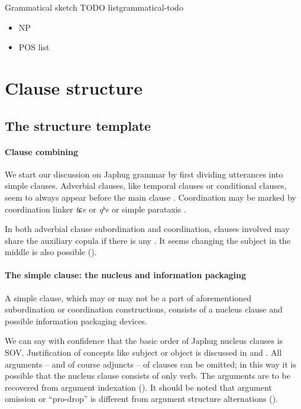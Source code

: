 \documentclass[a4paper, oneside, 12pt]{report}
\newcommand*{\citesec}[1]{\S~{#1}}
\newcommand*{\citechap}[1]{Ch~{#1}}
\newcommand*{\citepage}[1]{p.~{#1}}
\newcommand{\form}[1]{\emph{#1}}
\begin{document}
\begin{todobox}{Grammatical sketch TODO list}{grammatical-todo}
    \begin{itemize}
        \item NP
        \item POS list
    \end{itemize}
\end{todobox}

\section{Clause structure}\label{sec:grammatical.clause}

\subsection{The structure template}\label{sec:grammatical.clause.template}

\paragraph*{Clause combining}
We start our discussion on Japhug grammar 
by first dividing utterances into simple clauses.
Adverbial clauses, like temporal clauses or conditional clauses,
seem to always appear before the main clause \citep[\citechap{25}]{jacques2021grammar}.
Coordination may be marked by coordination linker \form{tɕe} or \form{qʰe} or simple parataxis
\citep[\citesec{25.1.6}]{jacques2021grammar}.

In both adverbial clause subordination and coordination,
clauses involved may share the auxiliary copula if there is any
\citep[\citepage{47}, (40); \citepage{1091}, (10)]{jacques2021grammar}.
It seems changing the subject in the middle is also possible
().

\paragraph*{The simple clause: the nucleus and information packaging}
\label{sec:grammatical.clause.template.nucleus-identification}
A simple clause, which may or may not be a part 
of aforementioned subordination or coordination constructions,
consists of a nucleus clause and possible information packaging devices.

We can say with confidence that the basic order of Japhug nucleus clauses is SOV.
Justification of concepts like subject or object is discussed in 
 and .
All arguments -- and of course adjuncts -- of clauses can be omitted;
in this way it is possible that the nucleus clause consists of only verb.
The arguments are to be recovered from argument indexation
().
It should be noted that argument omission or ``pro-drop''
is different from argument structure alternations
().
\end{document}
